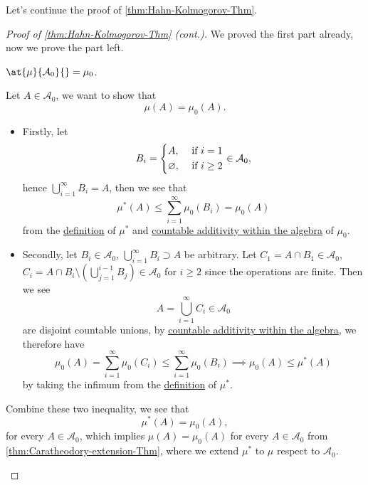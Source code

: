 Let's continue the proof of \autoref{thm:Hahn-Kolmogorov-Thm}.
\begin{proof}[Proof of \autoref{thm:Hahn-Kolmogorov-Thm} (cont.)]\label{pf:Hahn-Kolmogorov-Thm-cont}
	We proved the first part already, now we prove the part left.
	\begin{claim}
		\(\at{\mu }{\mathcal{A} _0}{} = \mu _0\).
	\end{claim}
	\begin{explanation}
		Let \(A\in \mathcal{A} _0\), we want to show that
		\[
			\mu (A) = \mu_0(A).
		\]
		\begin{itemize}
			\item Firstly, let
			      \[
				      B_{i} = \begin{dcases}
					      A,            & \text{ if } i= 1    \\
					      \varnothing , & \text{ if } i\geq 2
				      \end{dcases}\in \mathcal{A} _0,
			      \]
			      hence \(\bigcup_{i=1}^{\infty} B_{i} = A\), then we see that
			      \[
				      \mu ^{\ast} (A)\leq \sum_{i=1}^{\infty} \mu _0(B_{i}) = \mu _0(A)
			      \]
			      from the \hyperref[prop:outer-measure]{definition} of \(\mu ^{\ast} \) and \hyperref[def:pre-measure-countable-additivity-within-the-algebra]{countable additivity within the algebra}
			      of \(\mu _0\).
			\item Secondly, let \(B_{i}\in \mathcal{A} _0\), \(\bigcup_{i=1}^{\infty} B_{i}\supset A\) be arbitrary.
			      Let \(C_1 = A\cap B_1\in \mathcal{A} _0\), \(C_{i} = A\cap B_{i}\setminus \left(\bigcup_{j=1}^{i-1} B_{j}\right)\in \mathcal{A} _0\) for \(i\geq 2\)
			      since the operations are finite. Then we see
			      \[
				      A = \bigcup_{i=1}^{\infty} C_{i}\in \mathcal{A} _0
			      \]
			      are disjoint countable unions, by \hyperref[def:pre-measure-countable-additivity-within-the-algebra]{countable additivity within the algebra},
			      we therefore have
			      \[
				      \mu _0(A) = \sum_{i=1}^{\infty} \mu _0(C_{i}) \leq \sum_{i=1}^{\infty} \mu_0 (B_{i})\implies \mu _0(A)\leq \mu ^{\ast} (A)
			      \]
			      by taking the infimum from the \hyperref[prop:outer-measure]{definition} of \(\mu ^{\ast} \).
		\end{itemize}
		Combine these two inequality, we see that
		\[
			\mu ^{\ast} (A) = \mu _0(A),
		\]
		for every \(A\in\mathcal{A} _0\), which implies \(\mu (A) = \mu _0(A)\) for every \(A\in \mathcal{A}_0\) from \autoref{thm:Caratheodory-extension-Thm},
		where we extend \(\mu ^{\ast} \) to \(\mu \) respect to \(\mathcal{A}_0\).
	\end{explanation}
\end{proof}

